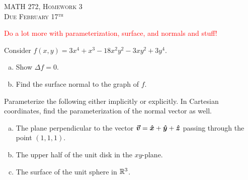 \documentclass[12pt]{article} %
\begin{document}
\begin{center}
   \textsc{\large MATH 272, Homework 3}\\
   \textsc{Due February 17$^\textrm{th}$}
\end{center}
\vspace{.5cm}

\textcolor{red}{Do a lot more with parameterization, surface, and normals and stuff!}

\begin{problem}
Consider $f(x,y)= 3x^4+x^3-18x^2y^2-3xy^2+3y^4$.
\begin{enumerate}[(a)]
    \item Show $\Delta f = 0$.
    \item Find the surface normal to the graph of $f$.
\end{enumerate}
\end{problem}

\begin{problem}
Parameterize the following either implicitly or explicitly. In Cartesian coordinates, find the parameterization of the normal vector as well.
\begin{enumerate}[(a)]
	\item The plane perpendicular to the vector $\boldsymbol{\vec{v}} = \boldsymbol{\hat{x}} + \boldsymbol{\hat{y}} + \boldsymbol{\hat{z}}$ passing through the point $(1,1,1)$.
	\item The upper half of the unit disk in the $xy$-plane.
	\item The surface of the unit sphere in $\mathbb{R}^3$.
\end{enumerate}
\end{problem}
\end{document}
